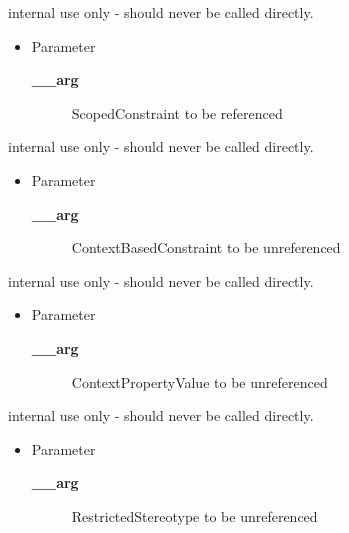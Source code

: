 \begin{desc}internal use only - should never be called directly.
\begin{itemize}
\item{Parameter
  \begin{description}
   \item[{\bf \_\_arg}]{ScopedConstraint to be referenced}
  \end{description}}
\end{itemize}
\end{desc}

\begin{desc}internal use only - should never be called directly.
\begin{itemize}
\item{Parameter
  \begin{description}
   \item[{\bf \_\_arg}]{ContextBasedConstraint to be unreferenced}
  \end{description}}
\end{itemize}
\end{desc}

\begin{desc}internal use only - should never be called directly.
\begin{itemize}
\item{Parameter
  \begin{description}
   \item[{\bf \_\_arg}]{ContextPropertyValue to be unreferenced}
  \end{description}}
\end{itemize}
\end{desc}

\begin{desc}internal use only - should never be called directly.
\begin{itemize}
\item{Parameter
  \begin{description}
   \item[{\bf \_\_arg}]{RestrictedStereotype to be unreferenced}
  \end{description}}
\end{itemize}
\end{desc}

